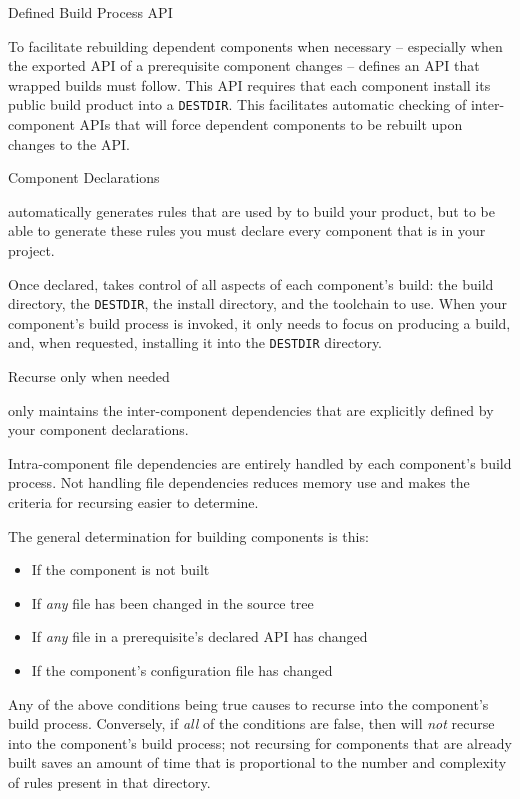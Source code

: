 \begin{description}
\item Defined Build Process API

  To facilitate rebuilding dependent components when necessary --
  especially when the exported API of a prerequisite component changes
  -- \lmsbw defines an API that wrapped builds must follow.  This API
  requires that each component install its public build product into a
  \texttt{DESTDIR}.  This facilitates automatic checking of
  inter-component APIs that will force dependent components to be
  rebuilt upon changes to the API.

\item Component Declarations

  \lmsbw automatically generates rules that are used by \make to build
  your product, but to be able to generate these rules you must
  declare every component that is in your project.

  Once declared, \lmsbw takes control of all aspects of each
  component's build: the build directory, the \texttt{DESTDIR}, the
  install directory, and the toolchain to use.  When your component's
  build process is invoked, it only needs to focus on producing a
  build, and, when requested, installing it into the \texttt{DESTDIR}
  directory.

\item Recurse only when needed\label{intro:build-component-criteria}

  \lmsbw only maintains the inter-component dependencies that are
  explicitly defined by your component declarations.

  Intra-component file dependencies are entirely handled by each
  component's build process.  Not handling file dependencies reduces
  memory use and makes the criteria for recursing easier to determine.

  The general determination for building components is this:

  \begin{itemize}
  \item If the component is not built
  \item If \emph{any} file has been changed in the source tree
  \item If \emph{any} file in a prerequisite's declared API has
    changed
  \item If the component's configuration file has changed
  \end{itemize}

  Any of the above conditions being true causes \lmsbw to recurse into
  the component's build process.  Conversely, if \emph{all} of the
  conditions are false, then \lmsbw will \emph{not} recurse into the
  component's build process; not recursing for components that are
  already built saves an amount of time that is proportional to the
  number and complexity of \make rules present in that directory.


\end{description}
